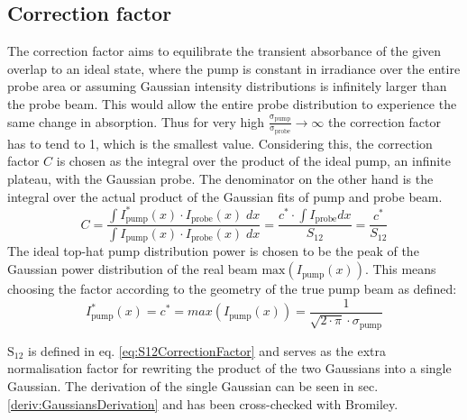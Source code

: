 \documentclass[twoside,openright,listof=numbered]{scrreprt}
\begin{document}
\subsection{Correction factor}\label{sec:CorrFactor}
The correction factor aims to equilibrate the transient absorbance of the given  overlap to an ideal state, where the pump is constant in irradiance over the entire probe area or assuming Gaussian intensity distributions is infinitely larger than the probe beam. This would allow the entire probe distribution to experience the same change in absorption.
Thus for very high $\mathrm{\frac{\sigma_\text{pump}}{\sigma_\text{probe}} \rightarrow \infty}$ the correction factor has to tend to 1, which is the smallest value.
Considering this, the correction factor $C$ is chosen as the integral over the product of the ideal pump, an infinite plateau, with the Gaussian probe. The denominator on the other hand is the integral over the actual product of the Gaussian fits of pump and probe beam.  
\begin{equation}\label{eq:CorrFactorGaussians} 
C = \dfrac{\int I_\text{pump}^*(x)\cdot I_\text{probe}(x) \;dx}{\int I_\text{pump}(x)\cdot I_\text{probe}(x) \; dx} = \dfrac{c^*\cdot \int I_\text{probe} dx}{S_{12}} = \dfrac{c^*}{S_{12}}
\end{equation}
The ideal top-hat pump distribution power is chosen to be the peak of the Gaussian power distribution of the real beam $\mathrm{max}\left(I_\text{pump}(x)\right)$. This means choosing the factor according to the geometry of the true pump beam as defined:
\begin{equation*}\label{eq:maxPowerGauss}
I_\text{pump}^*(x) = c^* = max(I_\text{pump}(x)) = \frac{1}{\sqrt{2\cdot\pi}\cdot\sigma_\text{pump}}
\end{equation*}

$\mathrm{S_{12}}$ is defined in eq. \ref{eq:S12CorrectionFactor} and serves as the extra normalisation factor for rewriting the product of the two Gaussians into a single Gaussian. The derivation of the single Gaussian can be seen in sec. \ref{deriv:GaussiansDerivation} and has been cross-checked with Bromiley.\cite{Bromiley2014}
\end{document}
